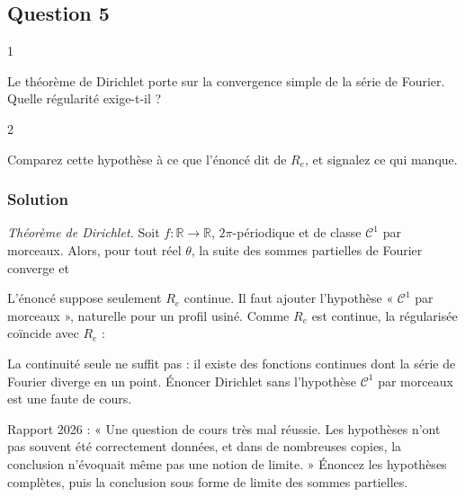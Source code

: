 \documentclass[11pt,a4paper]{article}
\newcommand{\equationajustee}[1]{%
  \sbox{\boiteequation}{$\displaystyle #1$}%
  \ifdim\wd\boiteequation>\linewidth
    \[\resizebox{\linewidth}{!}{\usebox{\boiteequation}}\]%
  \else
    \[#1\]%
  \fi}
\begin{document}
\hypertarget{question-5}{%
\subsection{Question 5}\label{question-5}}

\begin{indication}{1}

Le théorème de Dirichlet porte sur la convergence simple de la série de Fourier. Quelle régularité exige-t-il ?

\end{indication}

\begin{indication}{2}

Comparez cette hypothèse à ce que l'énoncé dit de \(R_e\), et signalez ce qui manque.

\end{indication}

\hypertarget{solution-4}{%
\subsubsection{Solution}\label{solution-4}}

\emph{Théorème de Dirichlet.} Soit \(f:\mathbb{R}\to\mathbb{R}\), \(2\pi\)-périodique et de classe \(\mathcal C^1\) par morceaux. Alors, pour tout réel \(\theta\), la suite des sommes partielles de Fourier converge et

\equationajustee{\lim_{N\to+\infty}S_N(f)(\theta)=\frac12\big(f(\theta^+)+f(\theta^-)\big).}

L'énoncé suppose seulement \(R_e\) continue. Il faut ajouter l'hypothèse « \(\mathcal C^1\) par morceaux », naturelle pour un profil usiné. Comme \(R_e\) est continue, la régularisée coïncide avec \(R_e\) :

\equationajustee{\forall\theta\in\mathbb{R},\qquad\lim_{N\to+\infty}S_N(\theta)=R_e(\theta).}

\begin{piege}

La continuité seule ne suffit pas : il existe des fonctions continues dont la série de Fourier diverge en un point. Énoncer Dirichlet sans l'hypothèse \(\mathcal C^1\) par morceaux est une faute de cours.

\end{piege}

\begin{jury}

Rapport 2026 : « Une question de cours très mal réussie. Les hypothèses n'ont pas souvent été correctement données, et dans de nombreuses copies, la conclusion n'évoquait même pas une notion de limite. » Énoncez les hypothèses complètes, puis la conclusion sous forme de limite des sommes partielles.

\end{jury}
\end{document}
